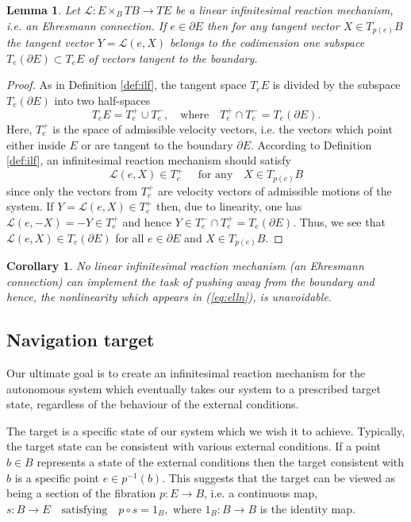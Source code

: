 \documentclass[11pt]{amsart}
\newtheorem{lemma}[theorem]{Lemma}
\newtheorem{corollary}[theorem]{Corollary}
\begin{document}
{\begin{lemma}\label{lm:47}
Let $\mathcal L: E\times_BTB\to TE$ be a linear infinitesimal reaction mechanism, i.e. an Ehresmann connection. If $e\in \partial E$ then for any 
tangent vector 
$X\in T_{p(e)}B$ the tangent vector $Y=\mathcal L(e, X)$ belongs to the codimension one subspace $T_e(\partial E)\subset T_eE$ of vectors tangent to the boundary. 
\end{lemma}
\begin{proof} As in Definition \ref{def:ilf}, the tangent space $T_eE$ is divided by the subspace $T_e(\partial E)$ into two half-spaces
$$
T_eE = T_e^+\cup T_e^-, \quad \mbox{where}\quad T_e^+ \cap T_e^- =T_e(\partial E).
$$
Here, $T_e^+$ is the space of admissible velocity vectors, i.e. the vectors which point either inside $E$ or are tangent to the boundary $\partial E$. 
According to Definition \ref{def:ilf}, an infinitesimal reaction mechanism should satisfy 
$$\mathcal L(e, X)\in T_e^+\quad\mbox{ for any}\quad  X\in T_{p(e)}B$$
since only the vectors from $T_e^+$ are velocity vectors of admissible motions of the system. 
If $Y=\mathcal L(e, X)\in T_e^+$ then, due to linearity, one has 
$\mathcal L(e, -X)=-Y\in T_e^+$ and hence 
$Y\in T_e^- \cap T_e^+=T_e(\partial E).$
Thus, we see that $\mathcal L(e, X)\in T_e(\partial E)$ for all $e\in \partial E$ and $X\in T_{p(e)}B$. 
\end{proof}
\begin{corollary}\label{cor:48}
No linear infinitesimal reaction mechanism (an Ehresmann connection) can implement the task of {\it pushing away from the boundary} and hence, the nonlinearity which appears in 
(\ref{eq:elln}), is unavoidable. 
\end{corollary}
\subsection{Navigation target} \label{sec:target} Our ultimate goal is to create an infinitesimal reaction mechanism for the autonomous system which 
eventually takes our system to a prescribed target state, regardless of the behaviour of the external conditions. 

The target is a specific state of our system which we wish it to achieve. Typically, the target state can be consistent with various external conditions. If a point 
$b\in B$ represents a state of the external conditions then the target consistent with $b$ is a specific point $e\in p^{-1}(b)$. 
This suggests that the target can be viewed as being a section 
of the fibration $p:E\to B$, i.e. a continuous map, 
$s: B\to E\quad\mbox{satisfying}\quad  p\circ s=1_B,$ 
where $1_B: B\to B$ is the identity map. 

}
\end{document}
